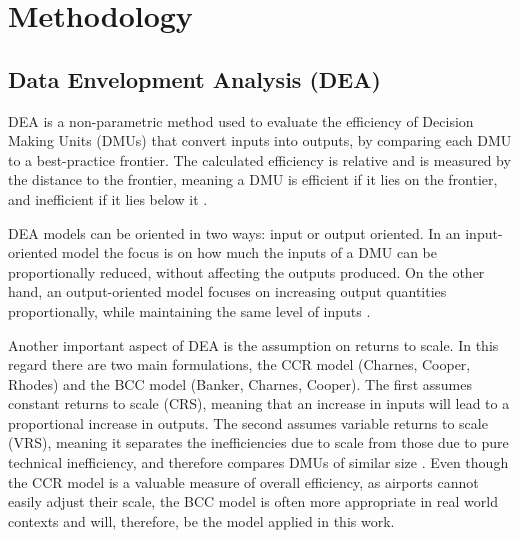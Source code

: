 \vspace{-0.015cm}
\section{Methodology}
\label{sec:imple}
\subsection{Data Envelopment Analysis (DEA)}
\label{dea}
DEA is a non-parametric method used to evaluate the efficiency of Decision Making Units (DMUs) that convert inputs into outputs, by comparing each DMU to a best-practice frontier. The calculated efficiency is relative and is
measured by the distance to the frontier, meaning a DMU is efficient if it lies on the frontier, and inefficient if it lies below it \cite{charnes1994}. 

DEA models can be oriented in two ways: input or output oriented. In an input-oriented model the focus is on how much the inputs of a DMU can be proportionally reduced, without affecting the outputs
produced. On the other hand, an output-oriented model focuses on increasing output quantities proportionally, while maintaining the same level of inputs \cite{charnes1994}. 

Another important aspect of DEA is the assumption on returns to scale. In this regard there are two
main formulations, the CCR model (Charnes, Cooper, Rhodes) and the BCC model (Banker, Charnes,
Cooper). The first assumes constant returns to scale (CRS), meaning that an increase in inputs will lead to a proportional increase in outputs. The second assumes variable returns to scale (VRS), meaning it separates the inefficiencies due to scale from those due to pure technical inefficiency, and therefore compares DMUs of similar size \cite{banker1984}. 
Even though the CCR model is a valuable measure of overall efficiency, as airports cannot easily adjust their scale, the BCC model is often more appropriate in real world contexts and will, therefore, be the model applied in this work.

